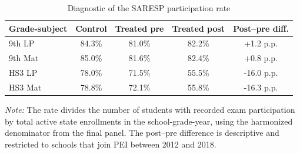 ﻿\begin{table}[htbp]
\centering
\caption{Diagnostic of the SARESP participation rate}
\label{tab:participacao_saresp}
\small
\begin{threeparttable}
\begin{tabular}{lcccc}
\toprule
Grade-subject & Control & Treated pre & Treated post & Post--pre diff. \\
\midrule
9th LP & 84.3\% & 81.0\% & 82.2\% & +1.2 p.p. \\
9th Mat & 85.0\% & 81.6\% & 82.4\% & +0.8 p.p. \\
HS3 LP & 78.0\% & 71.5\% & 55.5\% & -16.0 p.p. \\
HS3 Mat & 78.8\% & 72.1\% & 55.8\% & -16.3 p.p. \\
\bottomrule
\end{tabular}
\begin{tablenotes}
\footnotesize
\item \textit{Note:} The rate divides the number of students with recorded exam participation by total active state enrollments in the school-grade-year, using the harmonized denominator from the final panel. The post--pre difference is descriptive and restricted to schools that join PEI between 2012 and 2018.
\end{tablenotes}
\end{threeparttable}
\end{table}



